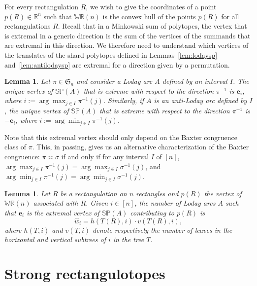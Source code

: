 \documentclass{amsart}
\newtheorem{lemma}[theorem]{Lemma}
\theoremstyle{definition}
\newcommand{\R}{\mathbb{R}} %
\newcommand{\f}[1]{\mathfrak{#1}} %
\newcommand{\polytope}[1]{\mathds{#1}} %
\newcommand{\WRP}{\polytope{WR}} %
\newcommand{\SP}{\polytope{SP}}
\newcommand{\loday}[1]{\overset{\frown}{#1}}
\newcommand{\baxtereq}{\asymp}%
\begin{document}
For every rectangulation $R$, we wish to give the coordinates of a point $p(R)\in\R^n$ such that $\WRP(n)$ is the convex hull of the points $p(R)$ for all rectangulations $R$.
Recall that in a Minkowski sum of polytopes, the vertex that is extremal in a generic direction is the sum of the vertices of the summands that are extremal in this direction.
We therefore need to understand which vertices of the translates of the shard polytopes defined in Lemmas~\ref{lem:lodaysp} and~\ref{lem:antilodaysp} are extremal for a direction given by a permutation.

\begin{lemma}
  \label{lem:lodaymax}
  Let $\pi\in\f{S}_n$ and consider a Loday arc $A$ defined by an interval $I$.
  The unique vertex of $\SP(A)$ that is extreme with respect to the direction $\pi^{-1}$
  is $\mathbf{e}_i$, where $i := \arg\max_{j\in I} \pi^{-1}(j)$.
  Similarly, if $A$ is an anti-Loday arc defined by $I$, the unique vertex of $\SP(A)$ that is extreme with respect to the direction $\pi^{-1}$
  is $-\mathbf{e}_i$, where $i := \arg\min_{j\in I} \pi^{-1}(j)$.
\end{lemma}

Note that this extremal vertex should only depend on the Baxter congruence class of $\pi$.
This, in passing, gives us an alternative characterization of the Baxter congruence:
$\pi\baxtereq\sigma$ if and only if for any interval $I$ of $[n]$,
$\arg\max_{j\in I} \pi^{-1}(j)=\arg\max_{j\in I} \sigma^{-1}(j)$, and
$\arg\min_{j\in I} \pi^{-1}(j)=\arg\min_{j\in I} \sigma^{-1}(j)$.

\begin{lemma}
  Let $R$ be a rectangulation on $n$ rectangles and $p(R)$ the vertex of $\WRP(n)$ associated with $R$.
  Given $i\in [n]$, the number of Loday arcs $A$ such that $\mathbf{e}_i$ is the extremal vertex of $\SP(A)$ contributing to $p(R)$ is
  \[
  \loday{w}_i =  h(T(R), i)\cdot v(T(R),i),
  \]
   where $h(T,i)$ and $v(T,i)$ denote respectively the number of leaves in the horizontal and vertical subtrees of $i$ in the tree $T$.
\end{lemma}


\section{Strong rectangulotopes}
\label{sec:sr}
\end{document}
